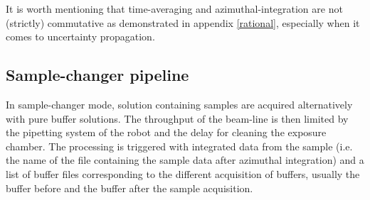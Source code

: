 \documentclass[preprint]{iucr}              %
\begin{document}



It is worth mentioning that time-averaging and azimuthal-integration are not (strictly) commutative as demonstrated in appendix \ref{rational}, especially when it comes to uncertainty propagation.


\subsection{Sample-changer pipeline}
\label{sc-pipeline}
In sample-changer mode, solution containing samples are acquired alternatively with pure buffer solutions.
The throughput of the beam-line is then limited by the pipetting system of the robot and the delay for cleaning the exposure chamber.  
The processing is triggered with integrated data from the sample (i.e. the name of the file containing the sample data after azimuthal integration) and a list of 
buffer files corresponding to the different acquisition of buffers, usually the buffer before and the buffer after the sample acquisition.
\end{document}
